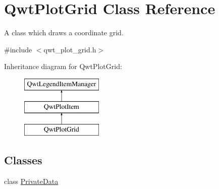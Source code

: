 \hypertarget{class_qwt_plot_grid}{\section{Qwt\-Plot\-Grid Class Reference}
\label{class_qwt_plot_grid}
}


A class which draws a coordinate grid.  




{\ttfamily \#include $<$qwt\-\_\-plot\-\_\-grid.\-h$>$}

Inheritance diagram for Qwt\-Plot\-Grid\-:\begin{figure}[H]
\begin{center}
\leavevmode
\includegraphics[height=3.000000cm]{class_qwt_plot_grid}
\end{center}
\end{figure}
\subsection*{Classes}
\begin{DoxyCompactItemize}
\item 
class \hyperlink{class_qwt_plot_grid_1_1_private_data}{Private\-Data}
\end{DoxyCompactItemize}
